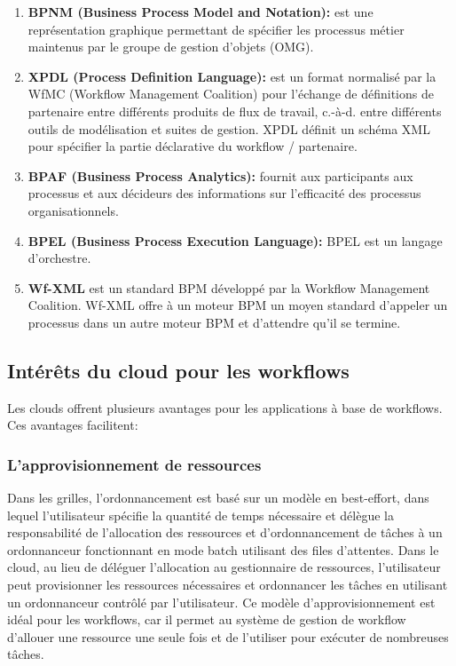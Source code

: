 \begin{enumerate}
\item \textbf{ BPNM (Business Process Model and Notation):} est une représentation graphique permettant de spécifier les processus métier maintenus par le groupe de gestion d'objets (OMG). 
\item \textbf{XPDL (Process Definition Language):} est un format normalisé par la WfMC (Workflow Management Coalition) pour l’échange de définitions de partenaire entre différents produits de flux de travail, c.-à-d. entre différents outils de modélisation et suites de gestion. XPDL définit un schéma XML pour spécifier la partie déclarative du workflow / partenaire.
\item \textbf{BPAF (Business Process Analytics):} fournit aux participants aux processus et aux décideurs des informations sur l'efficacité des processus organisationnels.
\item \textbf{BPEL (Business Process Execution Language):} BPEL est un langage d'orchestre.
\item \textbf{ Wf-XML }est un standard BPM développé par la Workflow Management Coalition. Wf-XML offre à un moteur BPM un moyen standard d'appeler un processus dans un autre moteur BPM et d'attendre qu'il se termine.
\end{enumerate}



\subsection{ Intérêts du cloud pour les workﬂows }
Les clouds offrent plusieurs avantages pour les applications à base de workflows. Ces avantages facilitent: 
\subsubsection{L’approvisionnement de ressources }
Dans les grilles, l'ordonnancement est basé sur un modèle en best-effort, dans lequel l’utilisateur spécifie la quantité de temps nécessaire et délègue la responsabilité de l'allocation des ressources et d'ordonnancement de tâches à un ordonnanceur fonctionnant en mode batch utilisant des files d’attentes. Dans le cloud, au lieu de déléguer l’allocation au gestionnaire de ressources, l'utilisateur peut provisionner les ressources nécessaires et ordonnancer les tâches en utilisant un ordonnanceur contrôlé par l'utilisateur. Ce modèle d’approvisionnement est idéal pour les workflows, car il permet au système de gestion de workflow d'allouer une ressource une seule fois et de l'utiliser pour exécuter de nombreuses tâches. 
